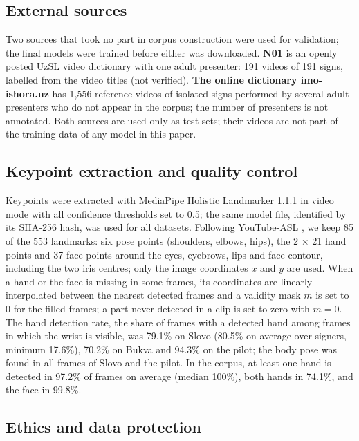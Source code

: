 \hypertarget{external-sources}{%
\subsection{External sources}\label{external-sources}}

Two sources that took no part in corpus construction were used for validation; the final models were trained before either was downloaded. \textbf{N01} is an openly posted UzSL video dictionary with one adult presenter: 191 videos of 191 signs, labelled from the video titles (not verified). \textbf{The online dictionary imo-ishora.uz} has 1,556 reference videos of isolated signs performed by several adult presenters who do not appear in the corpus; the number of presenters is not annotated. Both sources are used only as test sets; their videos are not part of the training data of any model in this paper.

\hypertarget{keypoint-extraction-and-quality-control}{%
\subsection{Keypoint extraction and quality control}\label{keypoint-extraction-and-quality-control}}

Keypoints were extracted with MediaPipe Holistic Landmarker 1.1.1 \citep{docs_mediapipe_holistic_landmarker} in video mode with all confidence thresholds set to 0.5; the same model file, identified by its SHA-256 hash, was used for all datasets. Following YouTube-ASL \citep{2023_uthus_youtube_asl}, we keep 85 of the 553 landmarks: six pose points (shoulders, elbows, hips), the 2 × 21 hand points and 37 face points around the eyes, eyebrows, lips and face contour, including the two iris centres; only the image coordinates \(x\) and \(y\) are used. When a hand or the face is missing in some frames, its coordinates are linearly interpolated between the nearest detected frames and a validity mask \(m\) is set to 0 for the filled frames; a part never detected in a clip is set to zero with \(m = 0\). The hand detection rate, the share of frames with a detected hand among frames in which the wrist is visible, was 79.1\% on Slovo (80.5\% on average over signers, minimum 17.6\%), 70.2\% on Bukva and 94.3\% on the pilot; the body pose was found in all frames of Slovo and the pilot. In the corpus, at least one hand is detected in 97.2\% of frames on average (median 100\%), both hands in 74.1\%, and the face in 99.8\%.

\hypertarget{ethics-and-data-protection}{%
\subsection{Ethics and data protection}\label{ethics-and-data-protection}}

